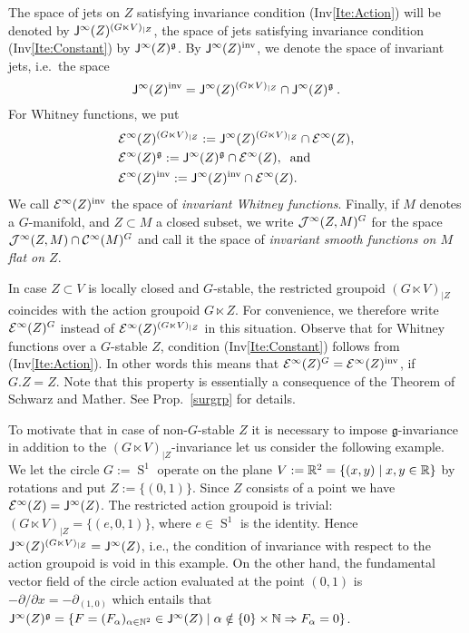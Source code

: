 The space of jets on $Z$ satisfying invariance condition (Inv\ref{Ite:Action}) will be  
denoted by $\mathsf{J}^\infty(Z)^{(G\ltimes V)_{|Z}}$, the space of jets satisfying invariance condition 
(Inv\ref{Ite:Constant}) by $\mathsf{J}^\infty(Z)^{\mathfrak{g}}$. By $\mathsf{J}^\infty(Z)^\textup{inv}$, we denote the 
space of invariant jets, i.e.~the space
\[
  \mathsf{J}^\infty(Z)^\textup{inv} = \mathsf{J}^\infty(Z)^{(G\ltimes V)_{|Z}} \cap \mathsf{J}^\infty(Z)^{\mathfrak{g}} \: .
\]
For Whitney functions, we put
\[
\begin{split}
 & \mathcal{E}^\infty(Z)^{(G\ltimes V)_{|Z}}:=\mathsf{J}^\infty(Z)^{(G\ltimes V)_{|Z}}\cap \mathcal{E}^\infty(Z), \\
 & \mathcal{E}^\infty(Z)^{\mathfrak{g}}:=\mathsf{J}^\infty(Z)^{\mathfrak{g}}\cap \mathcal{E}^\infty(Z), \: \text{ and } \\
 & \mathcal{E}^\infty(Z)^\textup{inv}:=\mathsf{J}^\infty(Z)^\textup{inv}\cap \mathcal{E}^\infty(Z).
\end{split}
\]
We call $\mathcal{E}^\infty(Z)^\textup{inv}$ the space of \emph{invariant Whitney functions}.
Finally, if $M$ denotes a $G$-manifold, and $Z\subset M$ a closed subset,
we write $\mathcal{J}^\infty(Z,M)^G$ for the space $\mathcal{J}^\infty(Z,M) \cap \mathcal{C}^\infty (M)^G$
and call it the space of \emph{invariant smooth functions on $M$ flat on $Z$}.
\begin{remark}
 In case $Z\subset V$ is locally closed and $G$-stable, the restricted groupoid 
 $(G\ltimes V)_{|Z}$ coincides with the action groupoid $G\ltimes Z$. For convenience, 
 we therefore write $\mathcal{E}^\infty(Z)^G$  instead of $\mathcal{E}^\infty(Z)^{(G\ltimes V)_{|Z}}$ 
 in this situation. Observe  that for Whitney functions over a $G$-stable 
 $Z$, condition (Inv\ref{Ite:Constant}) follows from (Inv\ref{Ite:Action}).  In other words 
 this means that $\mathcal{E}^\infty(Z)^G = \mathcal{E}^\infty(Z)^\textup{inv}$, if $G.Z =Z$.
 Note that this property is essentially  a consequence  of the Theorem of Schwarz and Mather.
 See Prop.~\ref{surgrp} for details. 
\end{remark}
\begin{example} To motivate that in case of non-$G$-stable $Z$ it is necessary to impose $\mathfrak g$-invariance in addition to the $(G\ltimes V)_{|Z}$-invariance let us consider the following example. We let the circle $G:=\operatorname S^1$ operate on the plane $V:=\mathbb{R}^2=\{(x,y)\mid x,y\in \mathbb{R}\}$ by rotations and put $Z:=\{(0,1)\}$. Since $Z$ consists of a point we have $\mathcal{E}^\infty(Z)=\mathsf{J}^\infty(Z)$. The restricted action groupoid is trivial: $(G\ltimes V)_{|Z}=\{(e,0,1)\}$, where $e\in \operatorname S^1$ is the identity. Hence 
 $\mathsf{J}^\infty(Z)^{(G\ltimes V)_{|Z}}=\mathsf{J}^\infty(Z)$, i.e., the condition of invariance with respect to the action groupoid is void in this example. On the other hand, the fundamental vector field of the circle action evaluated at the point $(0,1)$ is $-\partial/\partial x=-\partial_{(1,0)}$ which entails that $\mathsf{J}^\infty(Z)^\mathfrak g=\{F=(F_\alpha)_{\alpha\in \mathbb{N}^2}\in \mathsf{J}^\infty(Z)\mid \alpha \notin \{0\}\times\mathbb{N} \Rightarrow F_\alpha=0\}$. 
\end{example}

